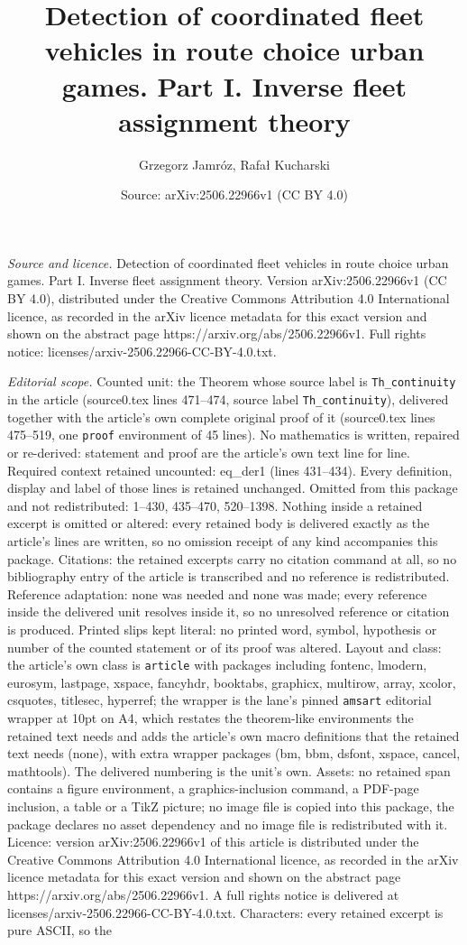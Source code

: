 \documentclass[10pt,a4paper]{amsart}
\title[Detection of coordinated fleet vehicles in route choice urba]{Detection of coordinated fleet vehicles in route choice urban games. Part I. Inverse fleet assignment theory}
\author{Grzegorz Jamr\'oz, Rafa{\l} Kucharski}
\date{Source: arXiv:2506.22966v1 (CC BY 4.0)}
\begin{document}
\maketitle

\noindent\emph{Source and licence.} Detection of coordinated fleet vehicles in route choice urban games. Part I. Inverse fleet assignment theory. Version arXiv:2506.22966v1 (CC BY 4.0), distributed under the Creative Commons Attribution 4.0 International licence, as recorded in the arXiv licence metadata for this exact version and shown on the abstract page https://arxiv.org/abs/2506.22966v1. Full rights notice: licenses/arxiv-2506.22966-CC-BY-4.0.txt.\par\smallskip

\noindent\textit{Editorial scope.} Counted unit: the Theorem whose source label is \texttt{Th\_continuity} in the article (source0.tex lines 471--474, source label \texttt{Th\_continuity}), delivered together with the article's own complete original proof of it (source0.tex lines 475--519, one \texttt{proof} environment of 45 lines). No mathematics is written, repaired or re-derived: statement and proof are the article's own text line for line. Required context retained uncounted: eq\_der1 (lines 431--434). Every definition, display and label of those lines is retained unchanged. Omitted from this package and not redistributed: 1--430, 435--470, 520--1398. Nothing inside a retained excerpt is omitted or altered: every retained body is delivered exactly as the article's lines are written, so no omission receipt of any kind accompanies this package. Citations: the retained excerpts carry no citation command at all, so no bibliography entry of the article is transcribed and no reference is redistributed. Reference adaptation: none was needed and none was made; every reference inside the delivered unit resolves inside it, so no unresolved reference or citation is produced. Printed slips kept literal: no printed word, symbol, hypothesis or number of the counted statement or of its proof was altered. Layout and class: the article's own class is \texttt{article} with packages including fontenc, lmodern, eurosym, lastpage, xspace, fancyhdr, booktabs, graphicx, multirow, array, xcolor, csquotes, titlesec, hyperref; the wrapper is the lane's pinned \texttt{amsart} editorial wrapper at 10pt on A4, which restates the theorem-like environments the retained text needs and adds the article's own macro definitions that the retained text needs (none), with extra wrapper packages (bm, bbm, dsfont, xspace, cancel, mathtools). The delivered numbering is the unit's own. Assets: no retained span contains a figure environment, a graphics-inclusion command, a PDF-page inclusion, a table or a TikZ picture; no image file is copied into this package, the package declares no asset dependency and no image file is redistributed with it. Licence: version arXiv:2506.22966v1 of this article is distributed under the Creative Commons Attribution 4.0 International licence, as recorded in the arXiv licence metadata for this exact version and shown on the abstract page https://arxiv.org/abs/2506.22966v1. A full rights notice is delivered at licenses/arxiv-2506.22966-CC-BY-4.0.txt. Characters: every retained excerpt is pure ASCII, so the 
\end{document}
